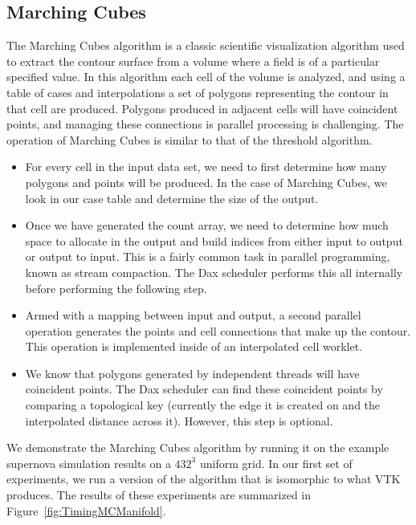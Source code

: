 \subsection{Marching Cubes}

The Marching Cubes algorithm is a classic scientific
visualization algorithm used to extract the contour surface from a volume
where a field is of a particular specified value. In this algorithm each
cell of the volume is analyzed, and using a table of cases and
interpolations a set of polygons representing the contour in that cell are
produced. Polygons produced in adjacent cells will have coincident points,
and managing these connections is parallel processing is challenging. The
operation of Marching Cubes is similar to that of the threshold algorithm.

\begin{itemize}
\item For every cell in the input data set, we need to first determine how
  many polygons and points will be produced. In the case of Marching Cubes,
  we look in our case table and determine the size of the output.
\item Once we have generated the count array, we need to determine how much
  space to allocate in the output and build indices from either input to
  output or output to input. This is a fairly common task in parallel
  programming, known as stream compaction. The Dax scheduler performs this
  all internally before performing the following step.
\item Armed with a mapping between input and output, a second parallel
  operation generates the points and cell connections that make up the
  contour. This operation is implemented inside of an interpolated cell
  worklet.
\item We know that polygons generated by independent threads will have
  coincident points. The Dax scheduler can find these coincident points by
  comparing a topological key (currently the edge it is created on and the
  interpolated distance across it). However, this step is optional.
\end{itemize}

We demonstrate the Marching Cubes algorithm by running it on the example
supernova simulation results on a $432^3$ uniform grid. In our first set of
experiments, we run a version of the algorithm that is isomorphic to what
VTK produces. The results of these experiments are summarized in
Figure~\ref{fig:TimingMCManifold}.

